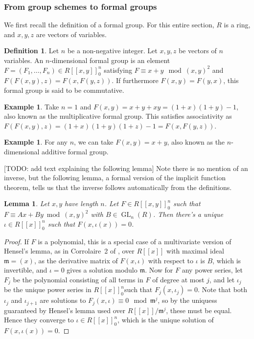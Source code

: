 \documentclass{article}
\newcommand{\m}{\mathfrak{m}}
\DeclareMathOperator{\GL}{GL}
\theoremstyle{plain}
\newtheorem{lem}[thm]{Lemma} %
\theoremstyle{definition}
\newtheorem{defn}[thm]{Definition} %
\newtheorem{exmp}[thm]{Example} %
\theoremstyle{remark}
\begin{document}
\subsubsection{From group schemes to formal groups}
We first recall the definition of a formal group. For this entire section, $R$ is a ring, and $x,y,z$ are vectors of variables.
\begin{defn}
\label{defn:formalgroup}
Let $n$ be a non-negative integer. Let $x,y,z$ be vectors of $n$ variables. An $n$-dimensional formal group is an element $F = (F_1,\dots,F_n) \in R[[x,y]]_0^n$ satisfying $F \equiv x + y \mod (x,y)^2$ and $F(F(x,y),z) = F(x,F(y,z))$. If furthermore $F(x,y) = F(y,x)$, this formal group is said to be commutative.
\end{defn}
\begin{exmp}
\label{exmp:gmformalgroup}
Take $n=1$ and $F(x,y) = x + y + xy = (1+x)(1+y)-1$, also known as the multiplicative formal group. This satisfies associativity as $F(F(x,y),z) = (1+x)(1+y)(1+z)-1 = F(x,F(y,z))$.
\end{exmp}
\begin{exmp}
\label{exmp:ganformalgroup}
For any $n$, we can take $F(x,y) = x+ y$, also known as the $n$-dimensional additive formal group.
\end{exmp}
[TODO: add text explaining the following lemma]
Note there is no mention of an inverse, but the following lemma, a formal version of the implicit function theorem, tells us that the inverse follows automatically from the definitions.
\begin{lem}
\label{lem:implicitfunction}
Let $x,y$ have length $n$. Let $F \in R[[x,y]]_0^n$ such that $F \equiv Ax + By \bmod (x,y)^2$ with $B \in \GL_n(R)$. Then there's a unique $\iota \in R[[x]]_0^n$ such that $F(x,\iota(x)) = 0$. 
\end{lem}
\begin{proof}
If $F$ is a polynomial, this is a special case of a multivariate version of Hensel's lemma, as in Corrolaire~2 of \cite[III,4.5]{BourbakiCA}, over $R[[x]]$ with maximal ideal $\m = (x)$, as the derivative matrix of $F(x,\iota)$ with respect to $\iota$ is $B$, which is invertible, and $\iota = 0$ gives a solution modulo $\m$. Now for $F$ any power series, let $F_j$ be the polynomial consisting of all terms in $F$ of degree at most $j$, and let $\iota_j$ be the unique power series in $R[[x]]_0^n$such that $F_j(x,\iota_j) = 0$. Note that both $\iota_j$ and $\iota_{j+1}$ are solutions to $F_j(x,\iota) \equiv 0 \mod \m^j$, so by the uniquess guaranteed by Hensel's lemma used over $R[[x]]/\m^j$, these must be equal. Hence they converge to $\iota \in R[[x]]_0^n$, which is the unique solution of $F(x,\iota(x)) = 0$.
\end{proof}
\end{document}
